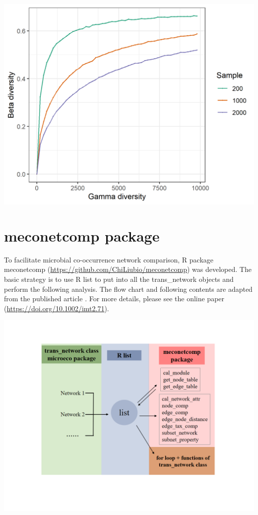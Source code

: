 \documentclass[
]{book}
\begin{document}
\begin{center}\includegraphics[width=600px]{Images/plot_gamma_simu} \end{center}

\hypertarget{meconetcomp-package}{%
\chapter{meconetcomp package}\label{meconetcomp-package}}

To facilitate microbial co-occurrence network comparison,
R package meconetcomp (\url{https://github.com/ChiLiubio/meconetcomp}) was developed.
The basic strategy is to use R list to put into all the trans\_network objects and perform the following analysis.
The flow chart and following contents are adapted from the published article \citep{Liu_meconetcomp_2023}.
For more details, please see the online paper (\url{https://doi.org/10.1002/imt2.71}).

\begin{center}\includegraphics[width=650px]{Images/meconetcomp} \end{center}
\end{document}
